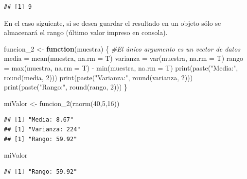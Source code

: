 \documentclass[
]{book}
\newenvironment{Shaded}{\begin{snugshade}}{\end{snugshade}}
\newcommand{\AttributeTok}[1]{\textcolor[rgb]{0.77,0.63,0.00}{#1}}
\newcommand{\CommentTok}[1]{\textcolor[rgb]{0.56,0.35,0.01}{\textit{#1}}}
\newcommand{\ControlFlowTok}[1]{\textcolor[rgb]{0.13,0.29,0.53}{\textbf{#1}}}
\newcommand{\DecValTok}[1]{\textcolor[rgb]{0.00,0.00,0.81}{#1}}
\newcommand{\FunctionTok}[1]{\textcolor[rgb]{0.00,0.00,0.00}{#1}}
\newcommand{\NormalTok}[1]{#1}
\newcommand{\OtherTok}[1]{\textcolor[rgb]{0.56,0.35,0.01}{#1}}
\newcommand{\SpecialCharTok}[1]{\textcolor[rgb]{0.00,0.00,0.00}{#1}}
\newcommand{\StringTok}[1]{\textcolor[rgb]{0.31,0.60,0.02}{#1}}
\begin{document}
\begin{verbatim}
## [1] 9
\end{verbatim}

En el caso siguiente, si se desea guardar el resultado en un objeto sólo se
almacenará el rango (último valor impreso en consola).

\begin{Shaded}
\begin{Highlighting}[]
\NormalTok{funcion\_2 }\OtherTok{\textless{}{-}} \ControlFlowTok{function}\NormalTok{(muestra) \{     }\CommentTok{\#El único argumento es un vector de datos}
\NormalTok{  media }\OtherTok{=} \FunctionTok{mean}\NormalTok{(muestra, }\AttributeTok{na.rm =}\NormalTok{ T)}
\NormalTok{  varianza }\OtherTok{=} \FunctionTok{var}\NormalTok{(muestra, }\AttributeTok{na.rm =}\NormalTok{ T)}
\NormalTok{  rango }\OtherTok{=} \FunctionTok{max}\NormalTok{(muestra, }\AttributeTok{na.rm =}\NormalTok{ T) }\SpecialCharTok{{-}} \FunctionTok{min}\NormalTok{(muestra, }\AttributeTok{na.rm =}\NormalTok{ T)}
  \FunctionTok{print}\NormalTok{(}\FunctionTok{paste}\NormalTok{(}\StringTok{"Media:"}\NormalTok{, }\FunctionTok{round}\NormalTok{(media, }\DecValTok{2}\NormalTok{)))}
  \FunctionTok{print}\NormalTok{(}\FunctionTok{paste}\NormalTok{(}\StringTok{"Varianza:"}\NormalTok{, }\FunctionTok{round}\NormalTok{(varianza, }\DecValTok{2}\NormalTok{)))}
  \FunctionTok{print}\NormalTok{(}\FunctionTok{paste}\NormalTok{(}\StringTok{"Rango:"}\NormalTok{, }\FunctionTok{round}\NormalTok{(rango, }\DecValTok{2}\NormalTok{)))}
\NormalTok{\}}

\NormalTok{miValor }\OtherTok{\textless{}{-}} \FunctionTok{funcion\_2}\NormalTok{(}\FunctionTok{rnorm}\NormalTok{(}\DecValTok{40}\NormalTok{,}\DecValTok{5}\NormalTok{,}\DecValTok{16}\NormalTok{))}
\end{Highlighting}
\end{Shaded}

\begin{verbatim}
## [1] "Media: 8.67"
## [1] "Varianza: 224"
## [1] "Rango: 59.92"
\end{verbatim}

\begin{Shaded}
\begin{Highlighting}[]
\NormalTok{miValor}
\end{Highlighting}
\end{Shaded}

\begin{verbatim}
## [1] "Rango: 59.92"
\end{verbatim}
\end{document}
